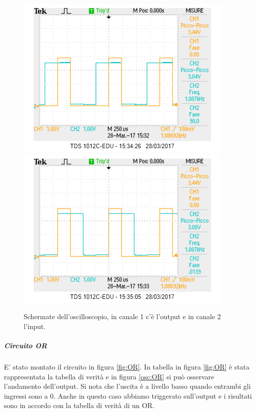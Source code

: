 \documentclass[10pt,a4paper]{article}
\begin{document}
\begin{figure}[!htb]
  \centering
  \includegraphics[scale=0.75]{and1.png}\includegraphics[scale=0.75]{and2.png}
\caption{Schermate dell'oscilloscopio, in canale 1 c'è l'output e in canale 2 l'input.\label{osc:AND}}
\end{figure}

\subparagraph{Circuito OR}

E' stato montato il circuito in figura \ref{fig:OR}. In tabella in figura \ref{fig:OR} è stata rappresentata la tabella di verità e in figura \ref{osc:OR} si può osservare l'andamento dell'output. Si nota che l'uscita è a livello basso quando entrambi gli ingressi sono a 0. Anche in questo caso abbiamo triggerato sull'output e i risultati sono in accordo con la tabella di verità di un OR.
\end{document}
